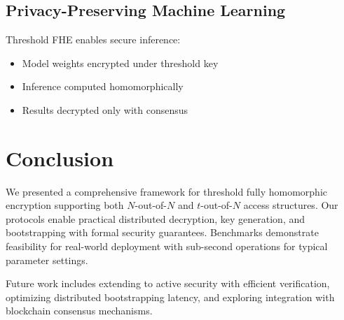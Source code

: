 \documentclass[11pt,a4paper]{article}
\begin{document}
\subsection{Privacy-Preserving Machine Learning}

Threshold FHE enables secure inference:
\begin{itemize}
    \item Model weights encrypted under threshold key
    \item Inference computed homomorphically
    \item Results decrypted only with consensus
\end{itemize}

\section{Conclusion}

We presented a comprehensive framework for threshold fully homomorphic encryption supporting both $N$-out-of-$N$ and $t$-out-of-$N$ access structures. Our protocols enable practical distributed decryption, key generation, and bootstrapping with formal security guarantees. Benchmarks demonstrate feasibility for real-world deployment with sub-second operations for typical parameter settings.

Future work includes extending to active security with efficient verification, optimizing distributed bootstrapping latency, and exploring integration with blockchain consensus mechanisms.
\end{document}
